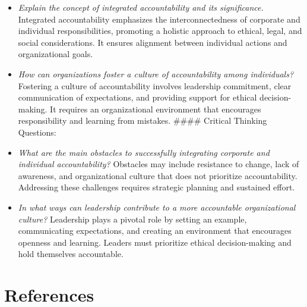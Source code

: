 \documentclass[
  letterpaper,
  DIV=11,
  numbers=noendperiod]{scrreprt}
\begin{document}
\begin{itemize}
\item
  \emph{Explain the concept of integrated accountability and its
  significance.} Integrated accountability emphasizes the
  interconnectedness of corporate and individual responsibilities,
  promoting a holistic approach to ethical, legal, and social
  considerations. It ensures alignment between individual actions and
  organizational goals.
\item
  \emph{How can organizations foster a culture of accountability among
  individuals?} Fostering a culture of accountability involves
  leadership commitment, clear communication of expectations, and
  providing support for ethical decision-making. It requires an
  organizational environment that encourages responsibility and learning
  from mistakes. \#\#\#\# Critical Thinking Questions:
\item
  \emph{What are the main obstacles to successfully integrating
  corporate and individual accountability?} Obstacles may include
  resistance to change, lack of awareness, and organizational culture
  that does not prioritize accountability. Addressing these challenges
  requires strategic planning and sustained effort.
\item
  \emph{In what ways can leadership contribute to a more accountable
  organizational culture?} Leadership plays a pivotal role by setting an
  example, communicating expectations, and creating an environment that
  encourages openness and learning. Leaders must prioritize ethical
  decision-making and hold themselves accountable.
\end{itemize}

\section{References}\label{references-2}
\end{document}
